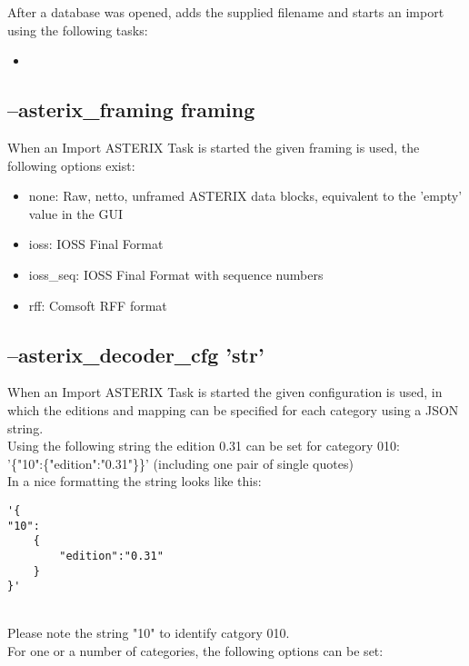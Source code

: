 After a database was opened, adds the supplied filename and starts an import using the following tasks:

\begin{itemize}
 \item {}
\end{itemize}


\subsection{--asterix\_framing framing}

When an Import ASTERIX Task is started the given framing is used, the following options exist:

\begin{itemize}
\item none:  Raw, netto, unframed ASTERIX data blocks, equivalent to the 'empty' value in the GUI
\item ioss:  IOSS Final Format
\item ioss\_seq: IOSS Final Format with sequence numbers
\item rff: Comsoft RFF format
\end{itemize}

\subsection{--asterix\_decoder\_cfg 'str'}

When an Import ASTERIX Task is started the given configuration is used, in which the editions and mapping can be specified for each category using a JSON string. \\

Using the following string the edition 0.31 can be set for category 010:  \\
'\{"10":\{"edition":"0.31"\}\}' (including one pair of single quotes) \\

In a nice formatting the string looks like this:
\begin{lstlisting}[basicstyle=\small\ttfamily]
'{
"10":
    {
        "edition":"0.31"
    }
}'
\end{lstlisting}
\ \\

Please note the string "10" to identify catgory 010. \\

For one or a number of categories, the following options can be set:

